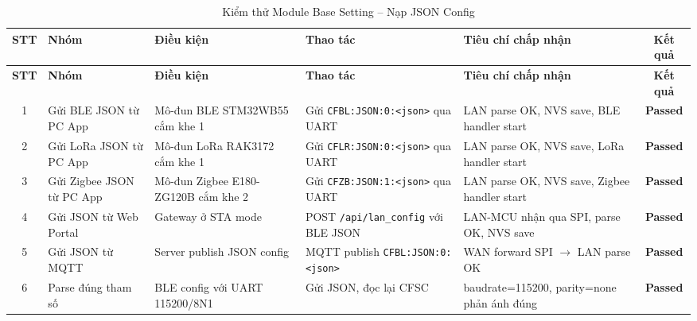         \begin{longtable}{|c|p{}|p{}|p{}|p{}|c|}
            \caption{Kiểm thử Module Base Setting -- Nạp JSON Config}
            \label{tab:test_module_base_json} \\
            \hline
            \textbf{STT} & \textbf{Nhóm} & \textbf{Điều kiện} & \textbf{Thao tác} & \textbf{Tiêu chí chấp nhận} & \textbf{Kết quả} \\ \hline
            \endfirsthead
            \hline
            \textbf{STT} & \textbf{Nhóm} & \textbf{Điều kiện} & \textbf{Thao tác} & \textbf{Tiêu chí chấp nhận} & \textbf{Kết quả} \\ \hline
            \endhead
            \hline
            \endfoot
            \endlastfoot
        
            1 & Gửi BLE JSON từ PC App & Mô-đun BLE STM32WB55 cắm khe 1 & Gửi \texttt{CFBL:JSON:0:}\newline\texttt{<json>} qua UART & LAN parse OK, NVS save, BLE handler start & \textcolor{modern_blue}{\textbf{Passed}} \\ \hline
            2 & Gửi LoRa JSON từ PC App & Mô-đun LoRa RAK3172 cắm khe 1 & Gửi \texttt{CFLR:JSON:0:}\newline\texttt{<json>} qua UART & LAN parse OK, NVS save, LoRa handler start & \textcolor{modern_blue}{\textbf{Passed}} \\ \hline
            3 & Gửi Zigbee JSON từ PC App & Mô-đun Zigbee E180-ZG120B cắm khe 2 & Gửi \texttt{CFZB:JSON:1:}\newline\texttt{<json>} qua UART & LAN parse OK, NVS save, Zigbee handler start & \textcolor{modern_blue}{\textbf{Passed}} \\ \hline
            4 & Gửi JSON từ Web Portal & Gateway ở STA mode & POST \texttt{/api/}\newline\texttt{lan\_config} với BLE JSON & LAN-MCU nhận qua SPI, parse OK, NVS save & \textcolor{modern_blue}{\textbf{Passed}} \\ \hline
            5 & Gửi JSON từ MQTT & Server publish JSON config & MQTT publish \texttt{CFBL:JSON:0:}\newline\texttt{<json>} & WAN forward SPI $\rightarrow$ LAN parse OK & \textcolor{modern_blue}{\textbf{Passed}} \\ \hline
            6 & Parse đúng tham số & BLE config với UART 115200/8N1 & Gửi JSON, đọc lại CFSC & baudrate=115200, parity=none phản ánh đúng & \textcolor{modern_blue}{\textbf{Passed}} \\ \hline

\end{longtable}
